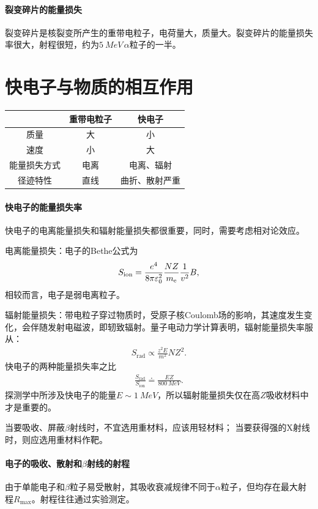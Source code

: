 \paragraph{裂变碎片的能量损失}
裂变碎片是核裂变所产生的重带电粒子，电荷量大，质量大。裂变碎片的能量损失率很大，射程很短，约为$\qty{5}{MeV}\,\alpha$粒子的一半。

\section{快电子与物质的相互作用}

\begin{center}
	\begin{tabular}{ccc}
		\toprule
		&重带电粒子&快电子\\
		\midrule
		质量&大&小\\
		速度&小&大\\
		能量损失方式&电离&电离、辐射\\
		径迹特性&直线&曲折、散射严重\\
		\bottomrule
	\end{tabular}
\end{center}
\paragraph{快电子的能量损失率}
快电子的电离能量损失和辐射能量损失都很重要，同时，需要考虑相对论效应。

电离能量损失：电子的Bethe公式为
\begin{align}
	S_{\mathrm{ion}} = \frac{e^4}{8\pi\varepsilon_0^2}\frac{NZ}{m_{\mathrm{e}}}\frac{1}{v^2}B,
\end{align}
相较而言，电子是弱电离粒子。

辐射能量损失：带电粒子穿过物质时，受原子核Coulomb场的影响，其速度发生变化，会伴随发射电磁波，即轫致辐射。量子电动力学计算表明，辐射能量损失率服从：
\begin{align}
	S_{\mathrm{rad}} \propto \frac{z^2E}{m^2}NZ^2.
\end{align}
快电子的两种能量损失率之比
\begin{align}
	\frac{S_{\mathrm{rad}}}{S_{\mathrm{ion}}} \doteq \frac{EZ}{\qty{800}{MeV}}.
\end{align}
探测学中所涉及快电子的能量$E \sim \qty{1}{MeV}$，所以辐射能量损失仅在高$Z$吸收材料中才是重要的。

当要吸收、屏蔽$\beta$射线时，不宜选用重材料，应该用轻材料；
当要获得强的X射线时，则应选用重材料作靶。

\paragraph{电子的吸收、散射和$\beta$射线的射程}
由于单能电子和$\beta$粒子易受散射，其吸收衰减规律不同于$\alpha$粒子，但均存在最大射程$R_{\max}$。射程往往通过实验测定。

